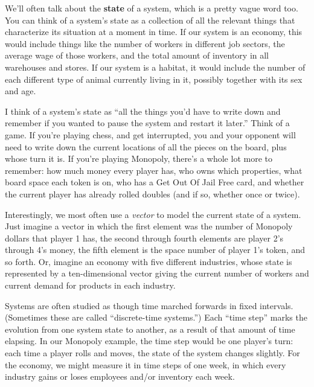 \begin{alttitles}
We'll often talk about the \textbf{state} of a system, which is a pretty vague
word too. You can think of a system's state as a collection of all the relevant
things that characterize its situation at a moment in time. If our system is an
economy, this would include things like the number of workers in different job
sectors, the average wage of those workers, and the total amount of inventory
in all warehouses and stores. If our system is a habitat, it would include the
number of each different type of animal currently living in it, possibly
together with its sex and age.


I think of a system's state as ``all the things you'd have to write down and
remember if you wanted to pause the system and restart it later.'' Think of a
game. If you're playing chess, and get interrupted, you and your opponent will
need to write down the current locations of all the pieces on the board, plus
whose turn it is. If you're playing Monopoly, there's a whole lot more to
remember: how much money every player has, who owns which properties, what
board space each token is on, who has a Get Out Of Jail Free card, and whether 
the current player has already rolled doubles (and if so, whether once or
twice).


Interestingly, we most often use a \textit{vector} to model the current state
of a system. Just imagine a vector in which the first element was the number of
Monopoly dollars that player 1 has, the second through fourth elements are
player 2's through 4's money, the fifth element is the space number of player
1's token, and so forth. Or, imagine an economy with five different industries,
whose state is represented by a ten-dimensional vector giving the current
number of workers and current demand for products in each industry.


Systems are often studied as though time marched forwards in fixed intervals.
(Sometimes these are called ``discrete-time systems.'') Each ``time step''
marks the evolution from one system state to another, as a result of that
amount of time elapsing. In our Monopoly example, the time step would be one
player's turn: each time a player rolls and moves, the state of the system
changes slightly. For the economy, we might measure it in time steps of one
week, in which every industry gains or loses employees and/or inventory each
week.


\end{alttitles}
